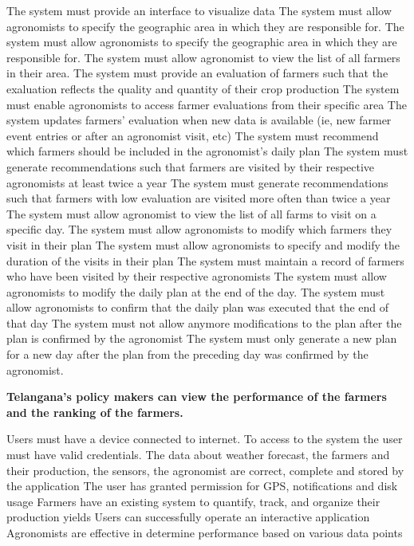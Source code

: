 \begin{itemize}
\begin{itemize}
 The system must provide an interface to visualize data
 The system must allow agronomists to specify the geographic area in which they are responsible for.
 The system must allow agronomists to specify the geographic area in which they are responsible for.
  The system must allow agronomist to view the list of all farmers in their area.
  The system must provide an evaluation of farmers such that the exaluation reflects the quality and quantity of their crop production
  The system must enable agronomists to access farmer evaluations from their specific area
  The system updates farmers' evaluation when new data is available (ie, new farmer event entries or after an agronomist visit, etc)
  The system must recommend which farmers should be included in the agronomist's daily plan
  The system must generate recommendations such that farmers are visited by their respective agronomists at least twice a year
  The system must generate recommendations such that farmers with low evaluation are visited more often than twice a year
  The system must allow agronomist to view the list of all farms to visit on a specific day.
  The system must allow agronomists to modify which farmers they visit in their plan
  The system must allow agronomists to specify and modify the duration of the visits in their plan
  The system must maintain a record of farmers who have been visited by their respective agronomists
 The system must allow agronomists to modify the daily plan at the end of the day.
 The system must allow agronomists to confirm that the daily plan was executed that the end of that day
 The system must not allow anymore modifications to the plan after the plan is confirmed by the agronomist
 The system must only generate a new plan for a new day after the plan from the preceding day was confirmed by the agronomist.
\end{itemize}

 \textbf{Telangana’s policy makers can view the performance of the farmers and the ranking of the farmers.}
\begin{itemize}
  Users must have a device connected to internet.
 To access to the system the user must have valid credentials.
 The data about weather forecast, the farmers and their production, the sensors, the agronomist are correct, complete and stored by the application
 The user has granted permission for GPS, notifications and disk usage
 Farmers have an existing system to quantify, track, and organize their production yields
 Users can successfully operate an interactive application
 Agronomists are effective in determine performance based on various data points



\end{itemize}
\end{itemize}
